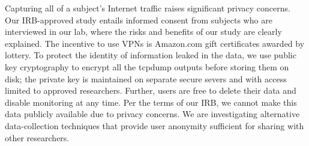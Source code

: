 Capturing all of a subject's Internet traffic raises significant
privacy concerns.  Our IRB-approved study entails informed consent
from subjects who are interviewed in our lab, where the risks and
benefits of our study are clearly explained.  The incentive to use
VPNs is Amazon.com gift certificates awarded by lottery. To protect the
identity of information leaked in the data, we use public key
cryptography to encrypt all the tcpdump outputs before storing them 
on disk; the private key is
maintained on separate secure severs and with access limited to
approved researchers.  Further, users are free to delete their
data and disable monitoring at any time.  Per the terms of our IRB, we cannot 
make this data publicly available due to privacy concerns. We are investigating 
alternative data-collection techniques that provide user anonymity sufficient 
for sharing with other researchers.



